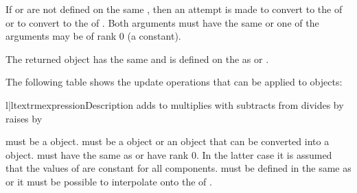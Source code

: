 If  or  are
not defined on the same \FunctionSpace, then an attempt is made to convert 
to the \FunctionSpace of  or to convert  to
the \FunctionSpace of . Both arguments must have the same
\Shape or one of the arguments may be of rank 0 (a constant).

The returned \Data object has the same \Shape and is defined on
the \DataSamplePoints as  or .

The following table shows the update operations that can be applied to
\Data objects:
\begin{tableii}{l|l}{textrm}{expression}{Description}
 {adds  to  \index{+}}
 {multiplies  with  \index{*}}
 {subtracts  from \index{-}}
 {divides  by  \index{/}}
 {raises  by  \index{**}}
\end{tableii}
 must be a \Data object.  must be a
\Data object or an object that can be converted into a
\Data object.  must have the same \Shape as
 or have rank 0.  In the latter case it is
assumed that the values of  are constant for all
components.  must be defined in the same \FunctionSpace as
 or it must be possible to interpolate  onto the
\FunctionSpace of .


